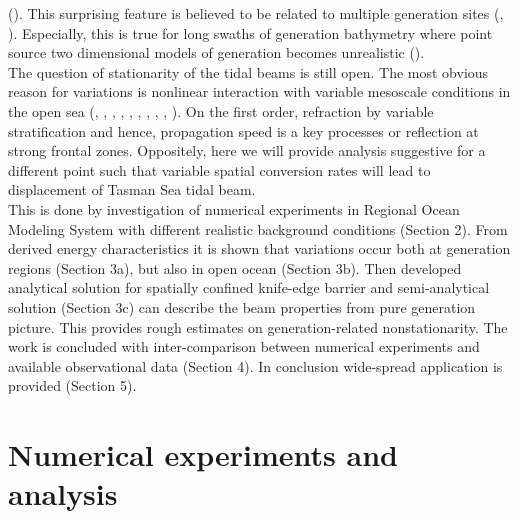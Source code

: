 \documentclass[12pt]{article}
\begin{document}
(\cite{zhao2016global}). This surprising feature is believed to be related to multiple generation 
sites (\cite{rainville2010interference}, \cite{terker2014observations}). Especially, this is true 
for long swaths of generation bathymetry where point source two dimensional models of generation 
becomes unrealistic (\cite{munroe2005topographic}).\\
The question of stationarity of the tidal beams is still open. The most obvious reason for 
variations is nonlinear interaction with variable mesoscale conditions in the open sea 
(\cite{kerry2016quantifying}, \cite{dunphy2014focusing}, \cite{chavanne2010surface}, 
\cite{ansong2017semidiurnal}, \cite{dunphy2017low}, \cite{zaron2014time}, 
\cite{doi:10.1080/03091927509365798}, \citep{kelly2016internal}, \citep{park2006internal}, 
\cite{rainville2006propagation}). On the first order, refraction by variable stratification and 
hence, propagation speed is a key processes or reflection at strong frontal zones. Oppositely, here 
we will provide analysis suggestive for a different point such that variable spatial conversion 
rates will lead to displacement of Tasman Sea tidal beam.\\
This is done by investigation of numerical experiments in Regional Ocean Modeling System with 
different realistic background conditions (Section 2). From derived energy characteristics it is 
shown that variations occur both at generation regions (Section 3a), but also in open ocean 
(Section 3b). Then developed analytical solution for spatially confined knife-edge barrier and 
semi-analytical solution (Section 3c) can describe the beam properties from pure generation 
picture. This provides rough estimates on generation-related nonstationarity. The work is concluded 
with inter-comparison between numerical experiments and available observational data (Section 4). 
In conclusion wide-spread application is provided (Section 5).\\

\newpage

\section{Numerical experiments and analysis}
\end{document}
